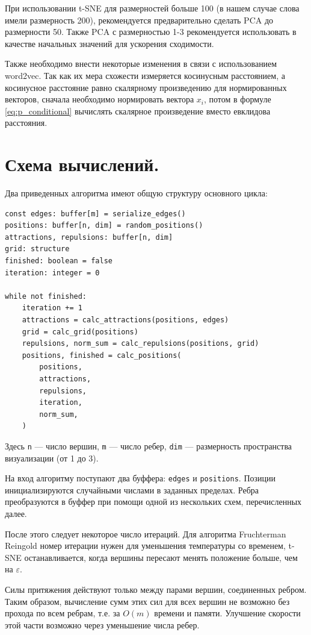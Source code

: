 При использовании t-SNE для размерностей больше 100 (в нашем случае слова имели размерность 200), рекомендуется предварительно сделать PCA до размерности 50. Также PCA с размерностью 1-3 рекомендуется использовать в качестве начальных значений для ускорения сходимости.

Также необходимо внести некоторые изменения в связи с использованием word2vec. Так как их мера схожести измеряется косинусным расстоянием, а косинусное расстояние равно скалярному произведению для нормированных векторов, сначала необходимо нормировать вектора $x_i$, потом в формуле \ref{eq:p_conditional} вычислять скалярное произведение вместо евклидова расстояния.

\section{Схема вычислений.}

Два приведенных алгоритма имеют общую структуру основного цикла:

\begin{verbatim}
const edges: buffer[m] = serialize_edges()
positions: buffer[n, dim] = random_positions()
attractions, repulsions: buffer[n, dim]
grid: structure
finished: boolean = false
iteration: integer = 0

while not finished:
    iteration += 1
    attractions = calc_attractions(positions, edges)
    grid = calc_grid(positions)
    repulsions, norm_sum = calc_repulsions(positions, grid)
    positions, finished = calc_positions(
        positions,
        attractions,
        repulsions,
        iteration,
        norm_sum,
    )
\end{verbatim}

Здесь \texttt{n} --- число вершин, \texttt{m} --- число ребер, \texttt{dim} --- размерность пространства визуализации (от 1 до 3).

На вход алгоритму поступают два буффера: \texttt{edges} и \texttt{positions}. Позиции инициализируются случайными числами в заданных пределах. Ребра преобразуются в буффер при помощи одной из нескольких схем, перечисленных далее.

После этого следует некоторое число итераций. Для алгоритма Fruchterman Reingold номер итерации нужен для уменьшения температуры со временем, t-SNE останавливается, когда вершины пересают менять положение больше, чем на $\varepsilon$.

Силы притяжения действуют только между парами вершин, соединенных ребром. Таким образом, вычисление сумм этих сил для всех вершин не возможно без прохода по всем ребрам, т.е. за $O(m)$ времени и памяти. Улучшение скорости этой части возможно через уменьшение числа ребер.


